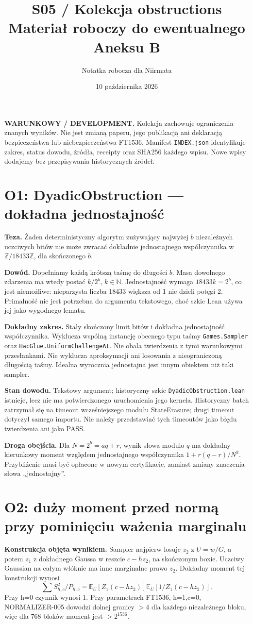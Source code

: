 \documentclass[11pt,a4paper]{article}
\title{S05 / Kolekcja obstructions\\\large Materiał roboczy do ewentualnego Aneksu B}
\author{Notatka robocza dla Niirmata}\date{10 października 2026}
\newcommand{\code}[1]{\nolinkurl{#1}}
\newcommand{\E}{\mathbb E}
\begin{document}
\maketitle
\textbf{WARUNKOWY / DEVELOPMENT.} Kolekcja zachowuje ograniczenia znanych
wyników. Nie jest zmianą paperu, jego publikacją ani deklaracją bezpieczeństwa
lub niebezpieczeństwa FT1536. Manifest \code{INDEX.json} identyfikuje
zakres, status dowodu, źródła, receipty oraz SHA256 każdego wpisu.
Nowe wpisy dodajemy bez przepisywania historycznych źródeł.

\section{O1: DyadicObstruction --- dokładna jednostajność}
\textbf{Teza.} Żaden deterministyczny algorytm zużywający najwyżej $b$
niezależnych uczciwych bitów nie może zwracać dokładnie jednostajnego
współczynnika w $\mathbb Z/18433\mathbb Z$, dla skończonego $b$.

\textbf{Dowód.} Dopełniamy każdą krótszą taśmę do długości $b$.
Masa dowolnego zdarzenia ma wtedy postać $k/2^b$, $k\in\mathbb N$.
Jednostajność wymaga $18433k=2^b$, co jest niemożliwe: nieparzysta liczba
18433 większa od 1 nie dzieli potęgi 2. Primalność nie jest potrzebna
do argumentu tekstowego, choć szkic Lean używa jej jako wygodnego lematu.

\textbf{Dokładny zakres.} Stały skończony limit bitów i dokładna
jednostajność współczynnika. Wyklucza wspólną instancję obecnego typu
taśmy \code{Games.Sampler} oraz \code{HacGlue.UniformChallengeAt}.
Nie obala twierdzenia z tymi warunkowymi przesłankami.
Nie wyklucza aproksymacji ani losowania z nieograniczoną długością taśmy.
Idealna wyrocznia jednostajna jest innym obiektem niż taki sampler.

\textbf{Stan dowodu.} Tekstowy argument; historyczny szkic
\code{DyadicObstruction.lean} istnieje, lecz nie ma potwierdzonego
uruchomienia jego kernela. Historyczny batch zatrzymał się na timeout
wcześniejszego modułu StateErasure; drugi timeout dotyczył samego importu.
Nie należy przedstawiać tych timeoutów jako błędu twierdzenia ani jako PASS.

\textbf{Droga obejścia.} Dla $N=2^b=aq+r$, wynik słowa modulo $q$ ma
dokładny kierunkowy moment względem jednostajnego współczynnika
$1+r(q-r)/N^2$. Przybliżenie musi być opłacone w nowym certyfikacie,
zamiast zmiany znaczenia słowa „jednostajny”.

\section{O2: duży moment przed normą przy pominięciu ważenia marginalu}
\textbf{Konstrukcja objęta wynikiem.} Sampler najpierw losuje $z_2$ z $U=w/G$,
a potem $z_1$ z dokładnego Gaussa w reszcie $c-hz_2$, na skończonym boxie.
Uczciwy Gaussian na całym włóknie ma inne marginalne prawo $z_2$.
Dokładny moment tej konstrukcji wynosi
\[
 \sum S_{h,c}^2/P_{h,c}
 =\E_U[Z_1(c-hz_2)]\E_U[1/Z_1(c-hz_2)].
\]
Przy h=0 czynnik wynosi 1. Przy parametrach FT1536, h=1,c=0,
NORMALIZER-005 dowodzi dolnej granicy $>4$ dla każdego niezależnego bloku,
więc dla 768 bloków moment jest $>2^{1536}$.
\end{document}
